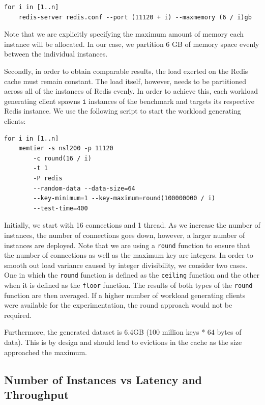 \begin{lstlisting}
for i in [1..n]
    redis-server redis.conf --port (11120 + i) --maxmemory (6 / i)gb
\end{lstlisting}

Note that we are explicitly specifying the maximum amount of memory each instance will be allocated. In our case, we partition 6 GB of memory space evenly between the individual instances.

Secondly, in order to obtain comparable results, the load exerted on the Redis cache must remain constant. The load itself, however, needs to be partitioned across all of the instances of Redis evenly. In order to achieve this, each workload generating client spawns \texttt{i} instances of the benchmark and targets its respective Redis instance. We use the following script to start the workload generating clients:

\begin{lstlisting}
for i in [1..n]
    memtier -s nsl200 -p 11120
        -c round(16 / i)
        -t 1
        -P redis
        --random-data --data-size=64
        --key-minimum=1 --key-maximum=round(100000000 / i)
        --test-time=400
\end{lstlisting}

Initially, we start with 16 connections and 1 thread. As we increase the number of instances, the number of connections goes down, however, a larger number of instances are deployed. Note that we are using a \texttt{round} function to ensure that the number of connections as well as the maximum key are integers. In order to smooth out load variance caused by integer divisibility, we consider two cases. One in which the \texttt{round} function is defined as the \texttt{ceiling} function and the other when it is defined as the \texttt{floor} function. The results of both types of the \texttt{round} function are then averaged. If a higher number of workload generating clients were available for the experimentation, the round approach would not be required.

Furthermore, the generated dataset is 6.4GB (100 million keys * 64 bytes of data). This is by design and should lead to evictions in the cache as the size approached the maximum.


\subsection{Number of Instances vs Latency and Throughput}

